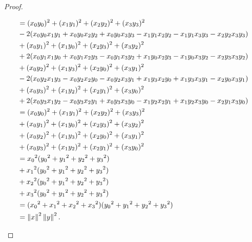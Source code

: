 \begin{proof}
\begin{itemize}
\begin{align*}
			&= (x_0y_0)^2 + (x_1y_1)^2 + (x_2y_2)^2 + (x_3y_3)^2 \\
			&- 2 (x_0y_0x_1y_1 + x_0y_0x_2y_2 + x_0y_0x_3y_3 - x_1y_1x_2y_2 - x_1y_1x_3y_3 - x_2y_2x_3y_3) \\
			&+ (x_0y_1)^2 + (x_1y_0)^2 + (x_2y_3)^2 + (x_3y_2)^2 \\
			&+ 2 (x_0y_1x_1y_0 + x_0y_1x_2y_3 - x_0y_1x_3y_2 + x_1y_0x_2y_3 - x_1y_0x_3y_2 - x_2y_3x_3y_2) \\
			&+ (x_0y_2)^2 + (x_1y_3)^2 + (x_2y_0)^2 + (x_3y_1)^2 \\
			&- 2 (x_0y_2x_1y_3 - x_0y_2x_2y_0 - x_0y_2x_3y_1 + x_1y_3x_2y_0 + x_1y_3x_3y_1 - x_2y_0x_3y_1) \\
			&+ (x_0y_3)^2 + (x_1y_2)^2 + (x_2y_1)^2 + (x_3y_0)^2 \\
			&+ 2 (x_0y_3x_1y_2 - x_0y_3x_2y_1 + x_0y_3x_3y_0 - x_1y_2x_2y_1 + x_1y_2x_3y_0 - x_2y_1x_3y_0) \\
			&= (x_0y_0)^2 + (x_1y_1)^2 + (x_2y_2)^2 + (x_3y_3)^2 \\
			&+ (x_0y_1)^2 + (x_1y_0)^2 + (x_2y_3)^2 + (x_3y_2)^2 \\
			&+ (x_0y_2)^2 + (x_1y_3)^2 + (x_2y_0)^2 + (x_3y_1)^2 \\
			&+ (x_0y_3)^2 + (x_1y_2)^2 + (x_2y_1)^2 + (x_3y_0)^2 \\
			&= {x_0}^2({y_0}^2+{y_1}^2+{y_2}^2+{y_3}^2) \\
			&+ {x_1}^2({y_0}^2+{y_1}^2+{y_2}^2+{y_3}^2) \\
			&+ {x_2}^2({y_0}^2+{y_1}^2+{y_2}^2+{y_3}^2) \\
			&+ {x_3}^2({y_0}^2+{y_1}^2+{y_2}^2+{y_3}^2) \\
			&= ({x_0}^2+{x_1}^2+{x_2}^2+{x_3}^2)({y_0}^2+{y_1}^2+{y_2}^2+{y_3}^2) \\
			&= \left\Vert{x}\right\Vert^2\left\Vert{y}\right\Vert^2.
		\end{align*}
	

\end{itemize}
\end{proof}
